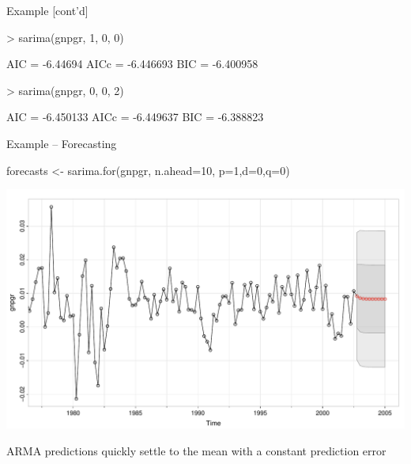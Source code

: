 \documentclass[ignorenonframetext,xcolor=x11names]{beamer}
\begin{document}
\begin{frame}[fragile]{Example \small [cont'd]}
\begin{textcode}
> sarima(gnpgr, 1, 0, 0)

AIC = -6.44694  AICc = -6.446693  BIC = -6.400958 
\end{textcode}

\begin{textcode}
> sarima(gnpgr, 0, 0, 2)

AIC = -6.450133  AICc = -6.449637  BIC = -6.388823 
\end{textcode}
\end{frame}


\begin{frame}[fragile]{Example -- Forecasting}
\begin{Rcode}
forecasts <- sarima.for(gnpgr, n.ahead=10, p=1,d=0,q=0)
\end{Rcode}
\begin{center}
\includegraphics[width=.75\textwidth]{figure21.pdf}
\end{center}
\vspace{-\baselineskip}
\begin{block}{}
\centering \small
ARMA predictions quickly settle to the mean with a constant prediction error
\end{block}
\end{frame}


\end{document}
